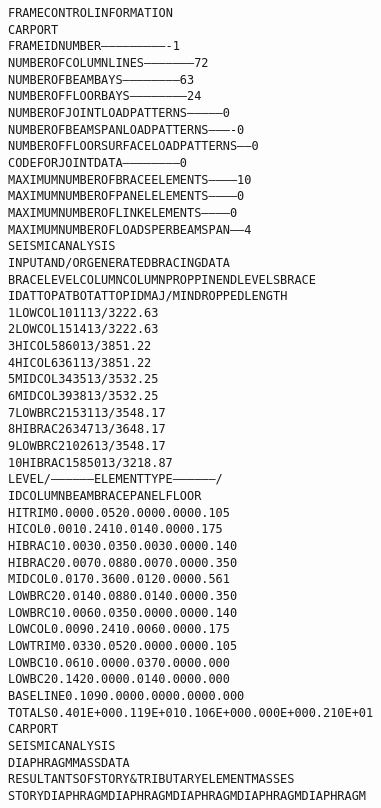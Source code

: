 \documentclass[12pt,notitle,letterpaper]{report}
\renewenvironment{quote}
  {\small\list{}{\rightmargin=0cm \leftmargin=0cm}%
   \item\relax}
  {\endlist}
\begin{document}
\begin{quote}
\begin{alltt}
F R A M E   C O N T R O L   I N F O R M A T I O N
CARPORT
FRAME ID NUMBER----------------------------    1
NUMBER OF COLUMN LINES---------------------   72
NUMBER OF BEAM BAYS------------------------   63
NUMBER OF FLOOR BAYS-----------------------   24
NUMBER OF JOINT LOAD PATTERNS--------------    0
NUMBER OF BEAM SPAN LOAD PATTERNS----------    0
NUMBER OF FLOOR SURFACE LOAD PATTERNS------    0
CODE FOR JOINT DATA------------------------    0
MAXIMUM NUMBER OF BRACE ELEMENTS-----------   10
MAXIMUM NUMBER OF PANEL ELEMENTS-----------    0
MAXIMUM NUMBER OF LINK  ELEMENTS-----------    0
MAXIMUM NUMBER OF LOADS PER BEAM SPAN------    4
SEISMIC ANALYSIS
INPUT AND/OR GENERATED BRACING DATA
BRACE  LEVEL      COLUMN   COLUMN     PROP  PIN END   LEVELS           BRACE
   ID  AT TOP     AT BOT   AT TOP       ID  MAJ/MIN  DROPPED          LENGTH
   1  LOWCOL         10       11        1      3/3        2           22.63
   2  LOWCOL         15       14        1      3/3        2           22.63
   3  HICOL          58       60        1      3/3        8           51.22
   4  HICOL          63       61        1      3/3        8           51.22
   5  MIDCOL         34       35        1      3/3        5           32.25
   6  MIDCOL         39       38        1      3/3        5           32.25
   7  LOWBRC2        15       31        1      3/3        5           48.17
   8  HIBRAC2        63       47        1      3/3        6           48.17
   9  LOWBRC2        10       26        1      3/3        5           48.17
   10  HIBRAC1        58       50        1      3/3        2           18.87
LEVEL    /------------------ELEMENT TYPE-----------------/
ID          COLUMN      BEAM     BRACE     PANEL     FLOOR
HITRIM       0.000     0.052     0.000     0.000     0.105
HICOL        0.001     0.241     0.014     0.000     0.175
HIBRAC1      0.003     0.035     0.003     0.000     0.140
HIBRAC2      0.007     0.088     0.007     0.000     0.350
MIDCOL       0.017     0.360     0.012     0.000     0.561
LOWBRC2      0.014     0.088     0.014     0.000     0.350
LOWBRC1      0.006     0.035     0.000     0.000     0.140
LOWCOL       0.009     0.241     0.006     0.000     0.175
LOWTRIM      0.033     0.052     0.000     0.000     0.105
LOWBC1       0.061     0.000     0.037     0.000     0.000
LOWBC2       0.142     0.000     0.014     0.000     0.000
BASELINE     0.109     0.000     0.000     0.000     0.000
TOTALS   0.401E+00 0.119E+01 0.106E+00 0.000E+00 0.210E+01
CARPORT
SEISMIC ANALYSIS
DIAPHRAGM MASS DATA
RESULTANTS OF STORY & TRIBUTARY ELEMENT MASSES
STORY     DIAPHRAGM   DIAPHRAGM   DIAPHRAGM   DIAPHRAGM   DIAPHRAGM

\end{alltt}
\end{quote}
\end{document}
